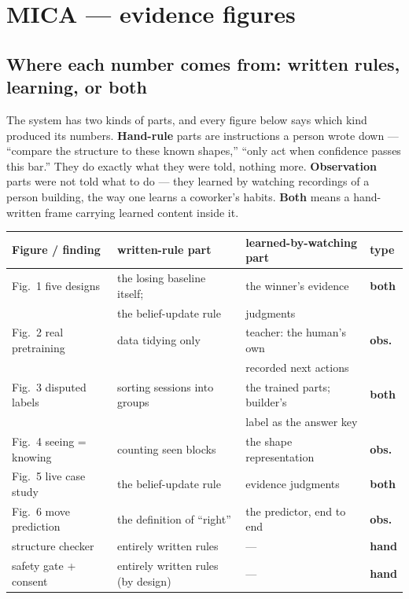 \documentclass[11pt]{article}
\begin{document}
\section*{MICA --- evidence figures}

\subsection*{Where each number comes from: written rules, learning, or both}

The system has two kinds of parts, and every figure below says which kind
produced its numbers. \textbf{Hand-rule} parts are instructions a person wrote
down --- ``compare the structure to these known shapes,'' ``only act when
confidence passes this bar.'' They do exactly what they were told, nothing
more. \textbf{Observation} parts were not told what to do --- they learned by
watching recordings of a person building, the way one learns a coworker's
habits. \textbf{Both} means a hand-written frame carrying learned content
inside it.

\begin{center}\small
\begin{tabular}{llll}
\toprule
Figure / finding & written-rule part & learned-by-watching part & type \\
\midrule
Fig.~1 five designs & the losing baseline itself; & the winner's evidence & \textbf{both}\\
 & the belief-update rule & judgments & \\
Fig.~2 real pretraining & data tidying only & teacher: the human's own & \textbf{obs.}\\
 & & recorded next actions & \\
Fig.~3 disputed labels & sorting sessions into groups & the trained parts; builder's & \textbf{both}\\
 & & label as the answer key & \\
Fig.~4 seeing = knowing & counting seen blocks & the shape representation & \textbf{obs.}\\
Fig.~5 live case study & the belief-update rule & evidence judgments & \textbf{both}\\
Fig.~6 move prediction & the definition of ``right'' & the predictor, end to end & \textbf{obs.}\\
structure checker & entirely written rules & --- & \textbf{hand}\\
safety gate + consent & entirely written rules (by design) & --- & \textbf{hand}\\
\bottomrule
\end{tabular}
\end{center}
\end{document}
